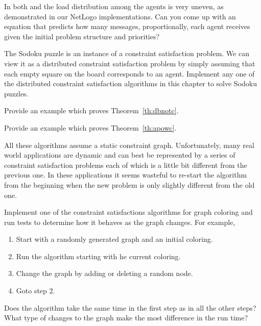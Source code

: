 \begin{exercises}

\item In both  and  the load distribution among
  the agents is very uneven, as demonstrated in our NetLogo
  implementations. Can you come up with an equation that predicts how
  many messages, proportionally, each agent receives given the initial
  problem structure and priorities?

\item The Sodoku puzzle is an instance of a constraint satisfaction
  problem. We can view it as a distributed constraint satisfaction
  problem by simply assuming that each empty square on the board
  corresponds to an agent. Implement any one of the
  distributed constraint satisfaction algorithms in this chapter to
  solve Sodoku puzzles.

\item Provide an example which proves Theorem~\ref{th:dbnotc}.

\item Provide an example which proves Theorem~\ref{th:apowc}.


\item All these algorithms assume a static constraint
  graph. Unfortunately, many real world applications are dynamic and
  can best be represented by a series of constraint satisfaction
  problems each of which is a little bit different from the previous
  one. In these applications it seems wasteful to re-start the
  algorithm from the beginning when the new problem is only slightly
  different from the old one.

  Implement one of the constraint satisfactions algorithms for graph
  coloring and run tests to determine how it behaves as the graph
  changes. For example, 
  \begin{enumerate}
  \item Start with a randomly generated graph and an initial coloring.
  \item Run the algorithm starting with he current coloring.
  \item Change the graph by adding or deleting a random node.
  \item Goto step 2.
  \end{enumerate}
  Does the algorithm take the same time in the first step as in all
  the other steps? What type of changes to the graph make the most
  difference in the run time?

\end{exercises}

